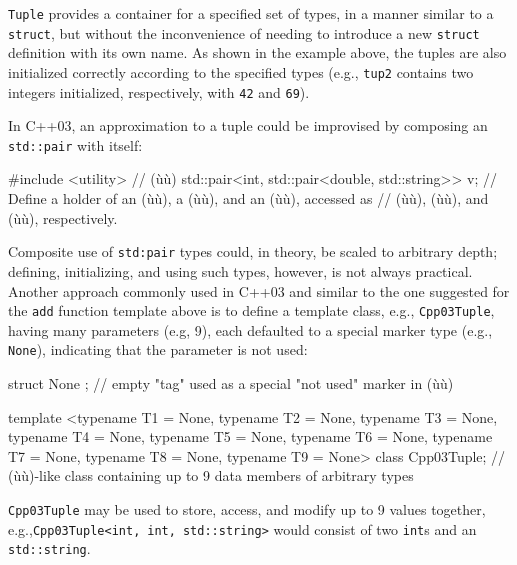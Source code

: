 \noindent \lstinline!Tuple! provides a container for a specified set of types, in a
manner similar to a \lstinline!struct!, but without the inconvenience of
needing to introduce a new \lstinline!struct! definition with its own name.
As shown in the example above, the tuples are also initialized correctly
according to the specified types (e.g., \lstinline!tup2! contains two
integers initialized, respectively, with \lstinline!42! and \lstinline!69!).

In C++03, an approximation to a tuple could be improvised by composing
an \lstinline!std::pair! with itself:

\begin{emcppslisting}
#include <utility>  // (ù{}ù)
std::pair<int, std::pair<double, std::string>> v;
    // Define a holder of an (ù{}ù), a (ù{}ù), and an (ù{}ù), accessed as
    // (ù{}ù), (ù{}ù), and (ù{}ù), respectively.
\end{emcppslisting}
    

\noindent Composite use of \lstinline!std:pair! types could, in theory, be scaled to
arbitrary depth; defining, initializing, and using such types, however,
is not always practical. Another approach commonly used in C++03 and
similar to the one suggested for the \lstinline!add! function template
above is to define a template class, e.g., \lstinline!Cpp03Tuple!, having
many parameters (e.g, 9), each defaulted to a special marker type (e.g.,
\lstinline!None!), indicating that the parameter is not used:

\begin{emcppslisting}
struct None { };  // empty "tag" used as a special "not used" marker in (ù{}ù)

template <typename T1 = None, typename T2 = None, typename T3 = None,
          typename T4 = None, typename T5 = None, typename T6 = None,
          typename T7 = None, typename T8 = None, typename T9 = None>
class Cpp03Tuple;
    // (ù{}ù)-like class containing up to 9 data members of arbitrary types
\end{emcppslisting}
    

\noindent \lstinline!Cpp03Tuple! may be used to store, access, and modify up to 9
values together, e.g.,\linebreak[4]%
\mbox{\lstinline!Cpp03Tuple<int,!~\lstinline!int,!~\lstinline!std::string>!} would
consist of two \lstinline!int!s and an \lstinline!std::string!.

